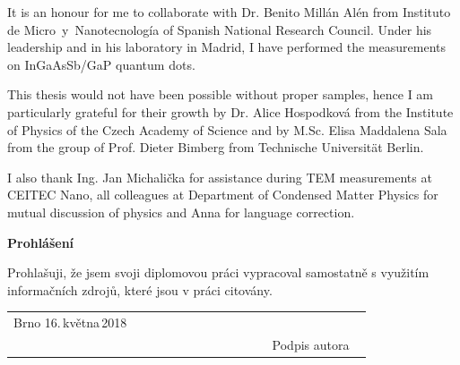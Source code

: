 \documentclass[
a4paper, %
11pt, %
onecolumn, %
openany, %
oldfontcommands,
]{memoir}
\begin{document}
It is an honour for me to collaborate with Dr. Benito Millán Alén from Instituto de Micro~y~Nanotecnología of Spanish National Research Council. Under his leadership and in his laboratory in Madrid, I have performed the measurements on InGaAsSb/GaP quantum dots.


This thesis would not have been possible without proper samples, hence I am particularly grateful for their growth by Dr. Alice Hospodková from the Institute of Physics of the Czech Academy of Science and by M.Sc. Elisa Maddalena Sala from the group of Prof. Dieter Bimberg from Technische Universität Berlin.

I also thank Ing. Jan Michalička for assistance during TEM measurements at CEITEC Nano, all colleagues at Department of Condensed Matter Physics for mutual discussion of physics and Anna for language correction.



\vfill
\noindent\Large\textbf{Prohlášení}\\ \normalsize

\noindent Prohlašuji, že jsem svoji diplomovou práci vypracoval samostatně
s využitím informačních zdrojů, které jsou v práci citovány.
\vspace{1cm}
\begin{center}
	\centering
	\begin{tabular}{p{0.5\linewidth}p{0.15\linewidth}p{0.25\linewidth}}
		Brno 16.\,května\,2018 &  & \\\cmidrule[0.5pt]{3-3}
		&&\centering Podpis autora \\ 
	\end{tabular}
\end{center}

\newpage

\end{document}
